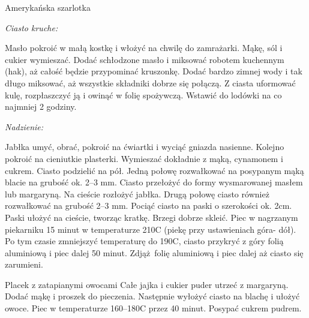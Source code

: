\documentclass[a4paper,12pt]{article}
\begin{document}
\begin{recipe}{Amerykańska szarlotka}{}{}

\freeform%
\begin{center}
\textit{Ciasto kruche:}
\end{center}
Masło pokroić w małą kostkę i włożyć na chwilę do zamrażarki.
Mąkę, sól i cukier wymieszać. Dodać schłodzone masło i miksować robotem kuchennym (hak), aż całość będzie przypominać kruszonkę.
\freeform%
Dodać bardzo zimnej wody i tak długo miksować, aż wszystkie składniki dobrze się połączą.
Z ciasta uformować kulę, rozpłaszczyć ją i owinąć w folię spożywczą. Wstawić do lodówki na co najmniej 2 godziny.

\freeform%
\begin{center}
\textit{Nadzienie:}
\end{center}

Jabłka umyć, obrać, pokroić na ćwiartki i wyciąć gniazda nasienne.
Kolejno pokroić na cieniutkie plasterki.
\freeform%
Wymieszać dokładnie z mąką, cynamonem i cukrem.
Ciasto podzielić na pół.
Jedną połowę rozwałkować na posypanym mąką blacie na grubość ok. 2--3 mm.
Ciasto przełożyć do formy wysmarowanej masłem lub margaryną.
Na cieście rozłożyć jabłka.
Drugą połowę ciasto również rozwałkować na grubość 2--3 mm.
Pociąć ciasto na paski o szerokości ok. 2cm. Paski ułożyć na cieście, tworząc kratkę.
Brzegi dobrze skleić.
Piec w nagrzanym piekarniku 15 minut w temperaturze 210\0C (piekę przy ustawieniach góra- dół).
Po tym czasie zmniejszyć temperaturę do 190\0C, ciasto przykryć z góry folią
aluminiową i piec dalej 50 minut. Zdjąż folię aluminiową i piec dalej aż ciasto się zarumieni.


\end{recipe}

\begin{recipe}{Placek z zatapianymi owocami}{}{}
Całe jajka i cukier puder utrzeć z margaryną. Dodać mąkę i proszek do pieczenia. Następnie wyłożyć ciasto na blachę i ułożyć owoce. Piec w temperaturze 160--180\0C przez 40 minut. Posypać cukrem pudrem.
\end{recipe}
\end{document}
